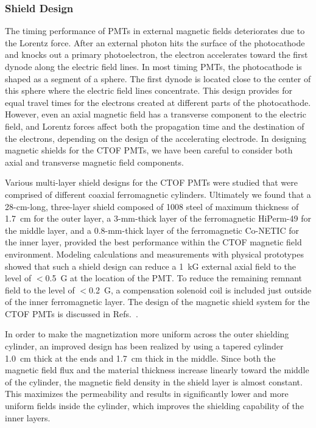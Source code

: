 \documentclass{elsart}
\begin{document}
\subsubsection{Shield Design}

The timing performance of PMTs in external magnetic fields deteriorates due to the Lorentz 
force. After an external photon hits the surface of the photocathode and knocks out a primary 
photoelectron, the electron accelerates toward the first dynode along the electric field lines. 
In most timing PMTs, the photocathode is shaped as a segment of a sphere. The first dynode is 
located close to the center of this sphere where the electric field lines concentrate. This 
design provides for equal travel times for the electrons created at different parts of the 
photocathode. However, even an axial magnetic field has a transverse component to the electric 
field, and Lorentz forces affect both the propagation time and the destination of the electrons, 
depending on the design of the accelerating electrode. In designing magnetic shields for the CTOF 
PMTs, we have been careful to consider both axial and transverse magnetic field components.

Various multi-layer shield designs for the CTOF PMTs were studied that were comprised of different
coaxial ferromagnetic cylinders. Ultimately we found that a 28-cm-long, three-layer shield
composed of 1008 steel of maximum thickness of 1.7~cm for the outer layer, a 3-mm-thick layer 
of the ferromagnetic HiPerm-49 for the middle layer, and a 0.8-mm-thick layer of the 
ferromagnetic Co-NETIC for the inner layer, provided the best performance within the CTOF 
magnetic field environment. Modeling calculations and measurements with physical prototypes 
showed that such a shield design can reduce a 1~kG external axial field to the level of 
$<$0.5~G at the location of the PMT. To reduce the remaining remnant field to the level 
of $<$0.2~G, a compensation solenoid coil is included just outside of the inner ferromagnetic layer.
The design of the magnetic shield system for the CTOF PMTs is discussed in
Refs.~\cite{baturin12,cn2015-003}.

In order to make the magnetization more uniform across the outer shielding cylinder, an 
improved design has been realized by using a tapered cylinder 1.0~cm thick at the ends and 
1.7~cm thick in the middle.  Since both the magnetic field flux and the material thickness 
increase linearly toward the middle of the cylinder, the magnetic field density in the shield 
layer is almost constant. This maximizes the permeability and results in significantly lower 
and more uniform fields inside the cylinder, which improves the shielding capability of the 
inner layers.
\end{document}
